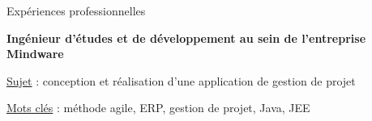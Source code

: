 \begin{rubric}{Expériences professionnelles}
    \hfill {}
    \par\hfill {}
\entry*[]
	\textbf{Ingénieur d'études et de développement au sein de l’entreprise Mindware}
     \hfill{} 
    \par \underline{Sujet} : {conception et réalisation d'une application de gestion de projet}
    \hfill {}
    \par \underline{Mots clés} : méthode agile, ERP, gestion de projet, Java, JEE
      \hfill {}
%
%
%
\end{rubric}
